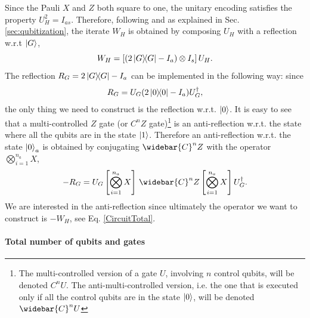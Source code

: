 \documentclass[a4paper,11pt]{article}
\begin{document}
Since the Pauli $X$ and $Z$ both square to one, the unitary encoding satisfies the property $U_H^2 = I_{as}$. Therefore, following \cite{Low2019hamiltonian} and as explained in Sec. \ref{sec:qubitization}, the iterate $W_H$ is obtained by composing $U_H$ with a reflection w.r.t $\ket{G}$,
\begin{equation}
    W_H = \left[(2\ketbra{G}-I_a)\otimes I_s\right]U_H.
\end{equation}
The reflection $R_G=2\ketbra{G}-I_a$ can be implemented in the following way: since
\begin{equation}
    R_G = U_G(2\ketbra{0}-I_a)U_G^{\dagger},
\end{equation}
the only thing we need to construct is the reflection w.r.t. $\ket{0}$. It is easy to see that a multi-controlled $Z$ gate (or $C^nZ$ gate)\footnote{The multi-controlled version of a gate $U$, involving $n$ control qubits, will be denoted $C^nU$. The anti-multi-controlled version, i.e. the one that is executed only if all the control qubits are in the state $\ket{0}$, will be denoted $\widebar{C}^nU$} is an anti-reflection w.r.t. the state where all the qubits are in the state $\ket{1}$. Therefore an anti-reflection w.r.t. the state $\ket{0}_a$ is obtained by conjugating $\widebar{C}^nZ$ with the operator $\bigotimes_{i=1}^{n_a}X$,
\begin{equation}
    -R_G = U_G \left[\bigotimes_{i=1}^{n_a}X\right]\, \widebar{C}^nZ \left[\bigotimes_{i=1}^{n_a}X\right] U_G^{\dagger}.
\end{equation}
We are interested in the anti-reflection since ultimately the operator we want to construct is $-W_H$, see Eq. \eqref{CircuitTotal}.


\paragraph{Total number of qubits and gates} 
\end{document}
